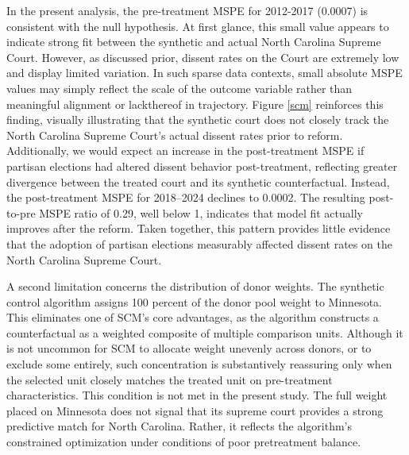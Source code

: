 In the present analysis, the pre-treatment MSPE for 2012-2017 (0.0007)
is consistent with the null hypothesis. At first glance, this small
value appears to indicate strong fit between the synthetic and actual
North Carolina Supreme Court. However, as discussed prior, dissent rates
on the Court are extremely low and display limited variation. In such
sparse data contexts, small absolute MSPE values may simply reflect the
scale of the outcome variable rather than meaningful alignment or
lackthereof in trajectory. Figure \ref{scm} reinforces this finding,
visually illustrating that the synthetic court does not closely track
the North Carolina Supreme Court's actual dissent rates prior to reform.
Additionally, we would expect an increase in the post-treatment MSPE if
partisan elections had altered dissent behavior post-treatment,
reflecting greater divergence between the treated court and its
synthetic counterfactual. Instead, the post-treatment MSPE for
2018--2024 declines to 0.0002. The resulting post-to-pre MSPE ratio of
0.29, well below 1, indicates that model fit actually improves after the
reform. Taken together, this pattern provides little evidence that the
adoption of partisan elections measurably affected dissent rates on the
North Carolina Supreme Court.

A second limitation concerns the distribution of donor weights. The
synthetic control algorithm assigns 100 percent of the donor pool weight
to Minnesota. This eliminates one of SCM's core advantages, as the
algorithm constructs a counterfactual as a weighted composite of
multiple comparison units. Although it is not uncommon for SCM to
allocate weight unevenly across donors, or to exclude some entirely,
such concentration is substantively reassuring only when the selected
unit closely matches the treated unit on pre-treatment characteristics.
This condition is not met in the present study. The full weight placed
on Minnesota does not signal that its supreme court provides a strong
predictive match for North Carolina. Rather, it reflects the algorithm's
constrained optimization under conditions of poor pretreatment balance.

